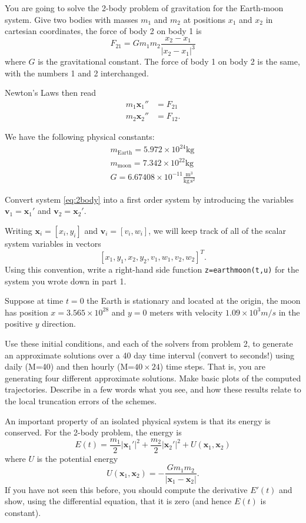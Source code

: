 \documentclass[minion]{homework}
\newcommand{\bfx}{\mathbf{x}}
\newcommand{\bfv}{\mathbf{v}}
\begin{document}
\begin{problems}
\problem You are going to solve the 2-body problem of gravitation for the Earth-moon system.  Give two bodies with masses $m_1$ and $m_2$
at positions $x_1$ and $x_2$ in cartesian coordinates,
the force of body 2 on body 1 is
\[
F_{21} = G m_1 m_2 \frac{x_2-x_1}{|x_2-x_1|^3}
\]
where $G$ is the gravitational constant.  The force of body 1 on body 2
is the same, with the numbers 1 and 2 interchanged.

Newton's Laws then read
\begin{align}\label{eq:2body}
m_1 \bfx_1'' &= F_{21}\\
m_2 \bfx_2'' &= F_{12}.
\end{align}

We have the following physical constants:
\begin{align*}
m_{\text{Earth}} = 5.972 \times 10^{24} \mathrm{kg}\\
m_{\text{moon}} =  7.342 \times 10^{22} \mathrm{kg}\\
G = 6.67408 \times 10^{-11} \frac{ \mathrm{m}^3 }{ \mathrm{kg} \, \mathrm{s}^2}
\end{align*}

\begin{subproblems}
\item Convert system \ref{eq:2body} into a first order system by
introducing the variables $\bfv_1=\bfx_1'$ and $\bfv_2=\bfx_2'$.
\item Writing $\bfx_i = [x_i,y_i]$ and $\bfv_i=[v_i,w_i]$, 
we will keep track of all of the scalar system variables
in vectors
\[
[x_1,y_1,x_2,y_2,v_1,w_1,v_2,w_2]^T.
\]
Using this convention, write a right-hand side 
function \texttt{z=earthmoon(t,u)} for the system you wrote 
down in part 1. 
\item Suppose at time $t=0$ the Earth is stationary and located
at the origin, the moon has position $x=3.565 \times 10^28$
and $y=0$ meters with velocity $1.09 \times 10^3 m/s$ in
the positive $y$ direction.

Use these initial conditions, and each of the solvers from problem 2, to generate an approximate solutions over a 40 day time interval (convert to seconds!) using daily (M=40) and then hourly (M=$40\times24$) time steps. That is, you are generating four different approximate
solutions.  Make basic plots of the computed trajectories.
 Describe in a few words what you see, and how these results relate to the local truncation errors of the schemes.

\item An important property of an isolated physical system is that
its energy is conserved.  For the 2-body problem, the energy
is 
\[
E(t) = \frac{m_1}{2}|\bfx_1'|^2 + \frac{m_2}{2}|\bfx_2'|^2 + U(\bfx_1,\bfx_2)
\]
where $U$ is the potential energy
\[
U(\bfx_1,\bfx_2) = -\frac{Gm_1m_2}{|\bfx_1-\bfx_2|}.
\]
If you have not seen this before, you should compute 
the derivative $E'(t)$ and show, using the differential equation, 
that it is zero (and hence $E(t)$ is constant).


\end{subproblems}
\end{problems}
\end{document}
